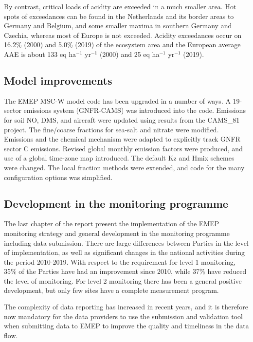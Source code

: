 By contrast, critical loads of acidity are exceeded in a much smaller area. Hot spots of
exceedances can be found in the Netherlands and its border areas to Germany and
Belgium, and some smaller maxima in southern Germany and Czechia, whereas most of Europe is not exceeded.
Acidity exceedances occur
on 16.2\% (2000) and 5.0\% (2019) of the ecosystem area and the European average
AAE is about 133 eq ha$^{-1}$ yr$^{-1}$ (2000) and 25 eq ha$^{-1}$ yr$^{-1}$ (2019).









\subsection*{Model improvements} %

The EMEP MSC-W model code has been upgraded in a number of ways. 
A 19-sector emissions system (GNFR-CAMS) was introduced into the code. Emissions for soil NO, DMS, and aircraft were updated using results from the CAMS\_81 project. 
The  fine/coarse fractions for sea-salt and nitrate were modified. Emissions and the chemical mechanism were adapted to explicitly track GNFR sector C emissions. Revised global monthly emission factors were produced, and use of a global time-zone map introduced. The default Kz and Hmix schemes were changed. The local fraction methods were extended, and code for the many configuration options was simplified. 




\subsection*{Development in the monitoring programme} %
The last chapter of the report present the implementation of the EMEP monitoring strategy and general development in the monitoring programme including data submission. There are large differences between Parties in the level of implementation, as well as significant changes in the national activities during the period 2010-2019. With respect to the requirement for level 1 monitoring, 35\% of the Parties have had an improvement since 2010, while 37\% have reduced the level of monitoring. For level 2 monitoring there has been a general positive development, but only few sites have a complete measurement program.

The complexity of data reporting has increased in recent years, and it is therefore now mandatory for the data providers to use the submission and validation tool when submitting data to EMEP to improve the quality and timeliness in the data flow.


